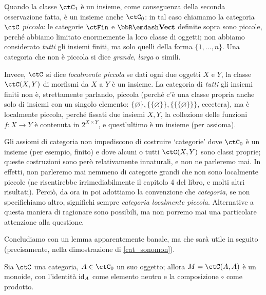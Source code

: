\begin{definition}
	Quando la classe \(\ctC_1\) è un insieme, come conseguenza della seconda osservazione fatta, è un insieme anche \(\ctC_0\): in tal caso chiamamo la categoria \(\ctC\) \emph{piccola}: le categorie \(\ctFin\) e \(\bbR\emdash\ctVect\) definite sopra sono piccole, perché abbiamo limitato enormemente la loro classe di oggetti; non abbiamo considerato \emph{tutti} gli insiemi finiti, ma solo quelli della forma \(\{1,\dots,n\}\). Una categoria che non è piccola si dice \emph{grande}, \emph{larga} o simili.

	Invece, \(\ctC\) si dice \emph{localmente piccola} se dati ogni due oggetti \(X\) e \(Y\), la classe \(\Hom{\ctC}(X,Y)\) di morfismi da \(X\) a \(Y\) è un insieme. La categoria di \emph{tutti} gli insiemi finiti non è, strettamente parlando, piccola (perché c'è una classe propria anche solo di insiemi con un singolo elemento: \(\{\varnothing\},\{\{\varnothing\}\}, \{\{\{\varnothing\}\}\}\), eccetera), ma è localmente piccola, perché fissati due insiemi \(X,Y\), la collezione delle funzioni \(f : X\to Y\) è contenuta in \(2^{X\times Y}\), e quest'ultimo è un insieme (per assioma).
\end{definition}
\begin{remark}
	Gli assiomi di categoria non impediscono di costruire `categorie' dove \(\ctC_0\) è un insieme (per esempio, finito) e dove alcuni o tutti \(\Hom{\ctC}(X,Y)\) sono classi proprie; queste costruzioni sono però relativamente innaturali, e non ne parleremo mai. In effetti, non parleremo mai nemmeno di categorie grandi che non sono localmente piccole (ne risentirebbe irrimediabilmente il capitolo 4 del libro, e molti altri risultati). Perciò, da ora in poi adottiamo la convenzione che \emph{categoria}, se non specifichiamo altro, significhi sempre \emph{categoria localmente piccola}. Alternative a questa maniera di ragionare sono possibili, ma non porremo mai una particolare attenzione alla questione.
\end{remark}
Concludiamo con un lemma apparentemente banale, ma che sarà utile in seguito (precisamente, nella dimostrazione di \ref{cat_sonomon}).
\begin{lemma}\label{lem_end_monoide}
	Sia \(\ctC\) una categoria, \(A\in\ctC_0\) un suo oggetto; allora \(M=\Hom{\ctC}(A,A)\) è un monoide, con l'identità \(\mathrm{id}_A\) come elemento neutro e la composizione \(\circ\) come prodotto.
\end{lemma}
